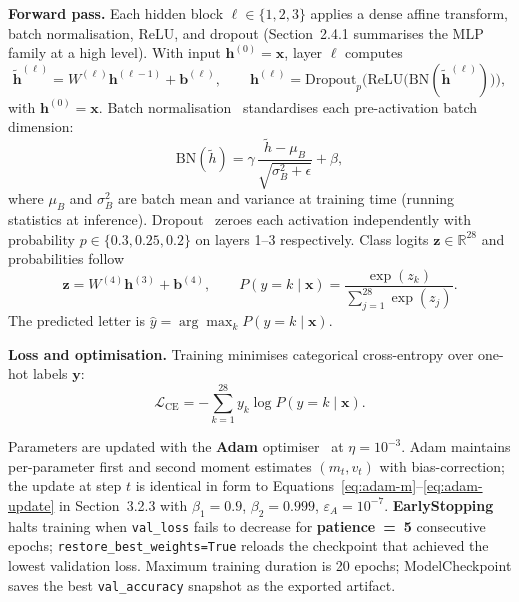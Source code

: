 \noindent\textbf{Forward pass.} Each hidden block $\ell \in \{1,2,3\}$ applies a dense affine transform, batch normalisation, ReLU, and dropout (Section~2.4.1 summarises the MLP family at a high level). With input $\mathbf{h}^{(0)} = \mathbf{x}$, layer $\ell$ computes
\begin{equation}
\tilde{\mathbf{h}}^{(\ell)} = W^{(\ell)} \mathbf{h}^{(\ell-1)} + \mathbf{b}^{(\ell)}, \qquad \mathbf{h}^{(\ell)} = \mathrm{Dropout}_p\!\Big(\mathrm{ReLU}\big(\mathrm{BN}(\tilde{\mathbf{h}}^{(\ell)})\big)\Big),
\end{equation}
with $\mathbf{h}^{(0)} = \mathbf{x}$. Batch normalisation~\cite{ioffe2015batchnorm} standardises each pre-activation batch dimension:
\begin{equation}
\mathrm{BN}(\tilde{h}) = \gamma \,\frac{\tilde{h} - \mu_B}{\sqrt{\sigma_B^2 + \epsilon}} + \beta,
\end{equation}
where $\mu_B$ and $\sigma_B^2$ are batch mean and variance at training time (running statistics at inference). Dropout~\cite{srivastava2014dropout} zeroes each activation independently with probability $p \in \{0.3, 0.25, 0.2\}$ on layers 1--3 respectively. Class logits $\mathbf{z} \in \mathbb{R}^{28}$ and probabilities follow
\begin{equation}
\mathbf{z} = W^{(4)} \mathbf{h}^{(3)} + \mathbf{b}^{(4)}, \qquad
P(y{=}k \mid \mathbf{x}) = \frac{\exp(z_k)}{\sum_{j=1}^{28} \exp(z_j)}.
\end{equation}
The predicted letter is $\hat{y} = \arg\max_k P(y{=}k \mid \mathbf{x})$.\par\vspace{0.15cm} %

\noindent\textbf{Loss and optimisation.} Training minimises categorical cross-entropy over one-hot labels $\mathbf{y}$:
\begin{equation}
\mathcal{L}_{\text{CE}} = -\sum_{k=1}^{28} y_k \log P(y{=}k \mid \mathbf{x}).
\end{equation}
\endgroup %

\enlargethispage{\baselineskip} %

\noindent Parameters are updated with the \textbf{Adam} optimiser~\cite{kingma2015adam} at $\eta{=}10^{-3}$. Adam maintains per-parameter first and second moment estimates $(m_t, v_t)$ with bias-correction; the update at step $t$ is identical in form to Equations~\eqref{eq:adam-m}--\eqref{eq:adam-update} in Section~3.2.3 with $\beta_1{=}0.9$, $\beta_2{=}0.999$, $\varepsilon_A{=}10^{-7}$. \textbf{EarlyStopping} halts training when \texttt{val\_loss} fails to decrease for \textbf{patience~=~5} consecutive epochs; \texttt{restore\_best\_weights=True} reloads the checkpoint that achieved the lowest validation loss. Maximum training duration is 20 epochs; ModelCheckpoint saves the best \texttt{val\_accuracy} snapshot as the exported artifact.\par\vspace{0.2cm} %

